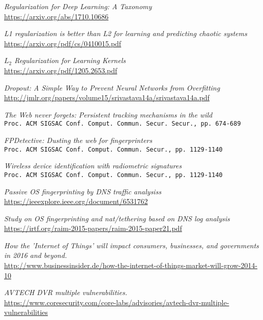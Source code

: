 \begin{thebibliography}{99}
\textit{Regularization for Deep Learning: A Taxonomy}
\\\url{https://arxiv.org/abs/1710.10686}


\textit{L1 regularization is better than L2 for learning and predicting chaotic systems
}
\\\url{https://arxiv.org/pdf/cs/0410015.pdf}

\textit{$L_2$ Regularization for Learning Kernels}
\\\url{https://arxiv.org/pdf/1205.2653.pdf}

\textit{Dropout: A Simple Way to Prevent Neural Networks from Overfitting}
\\\url{http://jmlr.org/papers/volume15/srivastava14a/srivastava14a.pdf}


\textit{The Web never forgets: Persistent tracking mechanisms in the wild}
\\\texttt{Proc. ACM SIGSAC Conf. Comput. Commun. Secur. Secur., pp. 674-689}

\textit{FPDetective: Dusting the web for fingerprinters}
\\\texttt{Proc. ACM SIGSAC Conf. Comput. Commun. Secur., pp. 1129-1140}

\textit{Wireless device identification with radiometric signatures}
\\\texttt{Proc. ACM SIGSAC Conf. Comput. Commun. Secur., pp. 1129-1140}

\textit{Passive OS fingerprinting by DNS traffic analysiss}
\\\url{https://ieeexplore.ieee.org/document/6531762}

\textit{Study on OS fingerprinting and nat/tethering based on DNS log analysis}
\\\url{https://irtf.org/raim-2015-papers/raim-2015-paper21.pdf}


\textit{How the ’Internet of Things’ will impact consumers,
businesses, and governments in 2016 and beyond.}
\\\url{http://www.businessinsider.de/how-the-internet-of-things-market-will-grow-2014-10}

\textit{AVTECH DVR multiple vulnerabilities.}
\\\url{https://www.coresecurity.com/core-labs/advisories/avtech-dvr-multiple-vulnerabilities}


\end{thebibliography}
